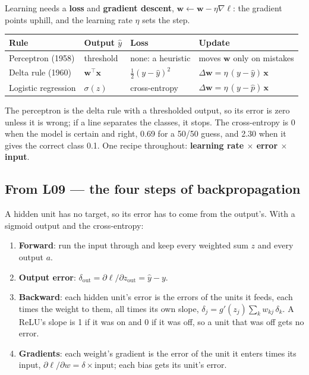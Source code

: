 \documentclass[11pt]{article}
\begin{document}
Learning needs a \textbf{loss} and \textbf{gradient descent},
$\mathbf{w}\leftarrow\mathbf{w}-\eta\nabla\ell$: the gradient points uphill, and
the learning rate $\eta$ sets the step.

\begin{center}
\begin{tabular}{@{}llll@{}}
\toprule
Rule & Output $\hat y$ & Loss & Update \\
\midrule
Perceptron (1958) & threshold & none: a heuristic & moves $\mathbf{w}$ only on mistakes \\
Delta rule (1960) & $\mathbf{w}^\top\mathbf{x}$ & $\tfrac12(y-\hat y)^2$ & $\Delta\mathbf{w}=\eta\,(y-\hat y)\,\mathbf{x}$ \\
Logistic regression & $\sigma(z)$ & cross-entropy & $\Delta\mathbf{w}=\eta\,(y-\hat p)\,\mathbf{x}$ \\
\bottomrule
\end{tabular}
\end{center}

The perceptron is the delta rule with a thresholded output, so its error is
zero unless it is wrong; if a line separates the classes, it stops. The
cross-entropy is 0 when the model is certain and right, 0.69 for a 50/50 guess,
and 2.30 when it gives the correct class 0.1. One recipe throughout:
\textbf{learning rate $\times$ error $\times$ input}.

\subsection{From L09 --- the four steps of backpropagation}

A hidden unit has no target, so its error has to come from the output's. With
a sigmoid output and the cross-entropy:

\begin{enumerate}
  \item \textbf{Forward}: run the input through and keep every weighted sum $z$
        and every output $a$.
  \item \textbf{Output error}: $\delta_{\text{out}}=\partial\ell/\partial z_{\text{out}}=\hat y-y$.
  \item \textbf{Backward}: each hidden unit's error is the errors of the units it
        feeds, each times the weight to them, all times its own slope,
        $\delta_j=g'(z_j)\sum_k w_{kj}\,\delta_k$. A ReLU's slope is 1 if it was
        on and 0 if it was off, so a unit that was off gets no error.
  \item \textbf{Gradients}: each weight's gradient is the error of the unit it
        enters times its input, $\partial\ell/\partial w=\delta\times\text{input}$;
        each bias gets its unit's error.
\end{enumerate}
\end{document}

